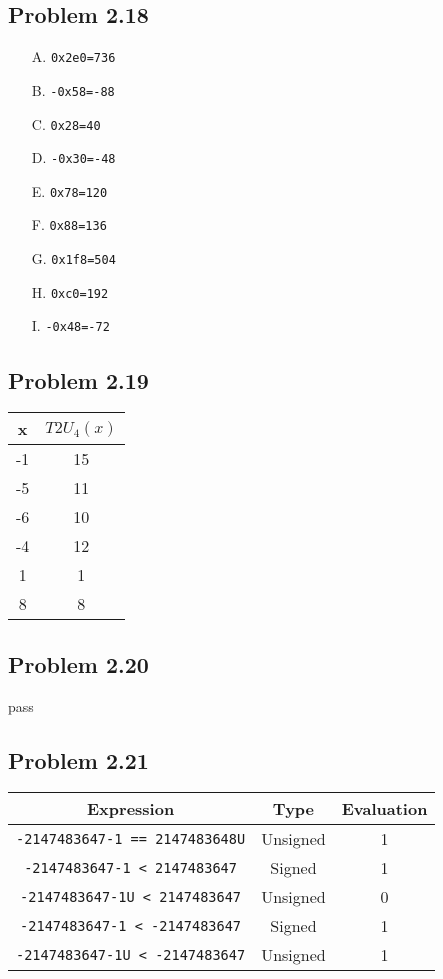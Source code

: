\documentclass[a4paper]{article}
\begin{document}
\subsection*{Problem 2.18}
\begin{enumerate}
    \item [A.] \tt{0x2e0=736}
    \item [B.] \tt{-0x58=-88}
    \item [C.] \tt{0x28=40}
    \item [D.] \tt{-0x30=-48}
    \item [E.] \tt{0x78=120}
    \item [F.] \tt{0x88=136}
    \item [G.] \tt{0x1f8=504}
    \item [H.] \tt{0xc0=192}
    \item [I.] \tt{-0x48=-72}
\end{enumerate}

\subsection*{Problem 2.19}
\begin{tabular}{cc}
    x&$T2U_4(x)$\\
    \hline
    -1&15\\
    -5&11\\
    -6&10\\
    -4&12\\
    1&1\\
    8&8
\end{tabular}

\subsection*{Problem 2.20}
pass

\subsection*{Problem 2.21}
\begin{tabular}{ccc}
    Expression&Type&Evaluation\\
    \hline
    \tt{-2147483647-1 == 2147483648U}&Unsigned&1\\
    \tt{-2147483647-1 < 2147483647}&Signed&1\\
    \tt{-2147483647-1U < 2147483647}&Unsigned&0\\
    \tt{-2147483647-1 < -2147483647}&Signed&1\\
    \tt{-2147483647-1U < -2147483647}&Unsigned&1
    
\end{tabular}
\end{document}
